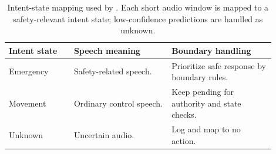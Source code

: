 \begin{table}[t]
    \centering
    \caption{Intent-state mapping used by \sys{}. Each short audio window is mapped to a safety-relevant intent state; low-confidence predictions are handled as unknown.}
    \label{tab:intent_state_mapping}
    \footnotesize
    \setlength{\tabcolsep}{3pt}
    \begin{tabular}{@{}p{0.22\linewidth}p{0.33\linewidth}p{0.35\linewidth}@{}}
        \toprule
        Intent state & Speech meaning & Boundary handling \\
        \midrule
        Emergency
        & Safety-related speech.
        & Prioritize safe response by boundary rules. \\
        Movement
        & Ordinary control speech.
        & Keep pending for authority and state checks. \\
        Unknown
        & Uncertain audio.
        & Log and map to no action. \\
        \bottomrule
    \end{tabular}
\end{table}

